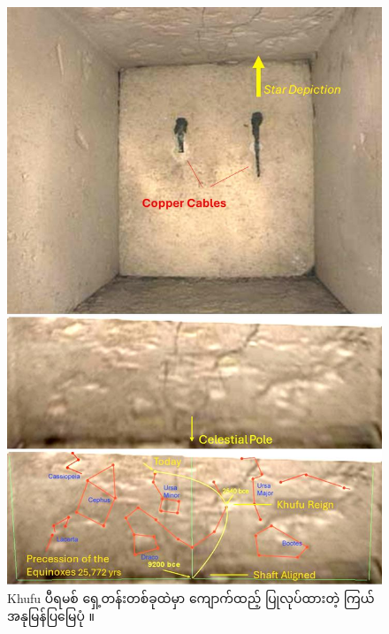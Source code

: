 \documentclass[10pt,twocolumn,letterpaper]{article}
\begin{document}
\begin{figure}[H]
\begin{center}
   \includegraphics[width=1\linewidth]{star-stone.jpg}
\end{center}
   \caption{Khufu ပီရမစ် ရှေ့တန်းတစ်ခုထဲမှာ ကျောက်ထည့် ပြုလုပ်ထားတဲ့ ကြယ်အနုမြန်ပြမြေပုံ \cite{28}။}
\label{fig:20}
\label{fig:onecol}
\end{figure}
\end{document}
